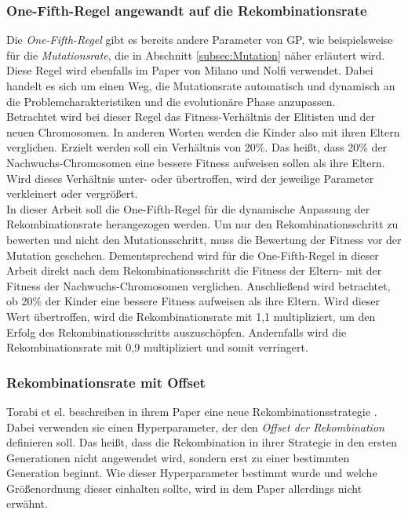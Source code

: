 \subsubsection{One-Fifth-Regel angewandt auf die Rekombinationsrate}
\label{subsubsec:oneFifthCrossover}

Die \emph{One-Fifth-Regel} gibt es bereits andere Parameter von GP, wie beispielsweise für die \emph{Mutationsrate}, die in Abschnitt \ref{subsec:Mutation} näher erläutert wird.
Diese Regel wird ebenfalls im Paper von Milano und Nolfi verwendet.
Dabei handelt es sich um einen Weg, die Mutationsrate automatisch und dynamisch an die Problemcharakteristiken und die evolutionäre Phase anzupassen. \cite{milano_scaling_2018}\\
Betrachtet wird bei dieser Regel das Fitness-Verhältnis der Elitisten und der neuen Chromosomen.
In anderen Worten werden die Kinder also mit ihren Eltern verglichen.
Erzielt werden soll ein Verhältnis von 20\%.
Das heißt, dass 20\% der Nachwuchs-Chromosomen eine bessere Fitness aufweisen sollen als ihre Eltern.
Wird dieses Verhältnis unter- oder übertroffen, wird der jeweilige Parameter verkleinert oder vergrößert. \cite{doerr_self-adjusting_2019}\\

In dieser Arbeit soll die One-Fifth-Regel für die dynamische Anpassung der Rekombinationsrate herangezogen werden.
Um nur den Rekombinationsschritt zu bewerten und nicht den Mutationsschritt, muss die Bewertung der Fitness vor der Mutation geschehen.
Dementsprechend wird für die One-Fifth-Regel in dieser Arbeit direkt nach dem Rekombinationsschritt die Fitness der Eltern- mit der Fitness der Nachwuchs-Chromosomen verglichen.
Anschließend wird betrachtet, ob 20\% der Kinder eine bessere Fitness aufweisen als ihre Eltern.
Wird dieser Wert übertroffen, wird die Rekombinationsrate mit 1,1 multipliziert, um den Erfolg des Rekombinationsschritts auszuschöpfen.
Andernfalls wird die Rekombinationsrate mit 0,9 multipliziert und somit verringert.


\subsubsection{Rekombinationsrate mit Offset}
\label{subsubsec:offsetCrossover}
Torabi et el. beschreiben in ihrem Paper eine neue Rekombinationsstrategie \cite{torabi_using_2022}.
Dabei verwenden sie einen Hyperparameter, der den \emph{Offset der Rekombination} definieren soll.
Das heißt, dass die Rekombination in ihrer Strategie in den ersten Generationen nicht angewendet wird, sondern erst zu einer bestimmten Generation beginnt.
Wie dieser Hyperparameter bestimmt wurde und welche Größenordnung dieser einhalten sollte, wird in dem Paper allerdings nicht erwähnt.\\

